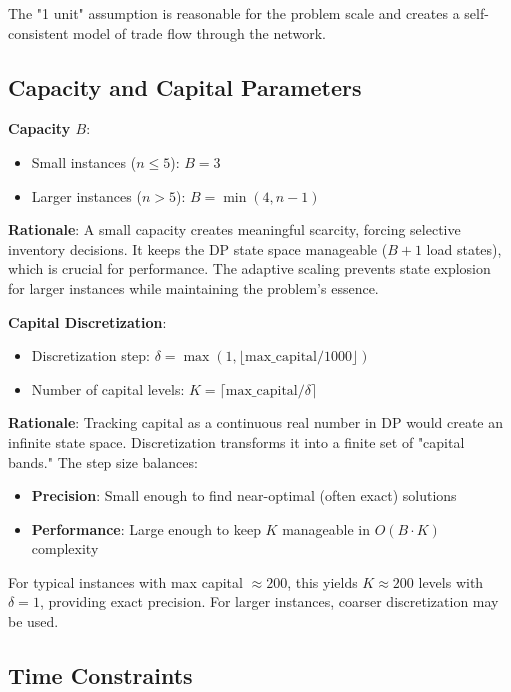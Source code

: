\documentclass[12pt]{article}
\begin{document}
The "1 unit" assumption is reasonable for the problem scale and creates a self-consistent model of trade flow through the network.

\subsection{Capacity and Capital Parameters}
\label{subsec:parameters}

\textbf{Capacity $B$}:
\begin{itemize}
    \item Small instances ($n \leq 5$): $B = 3$
    \item Larger instances ($n > 5$): $B = \min(4, n-1)$
\end{itemize}

\textbf{Rationale}: A small capacity creates meaningful scarcity, forcing selective inventory decisions. It keeps the DP state space manageable ($B+1$ load states), which is crucial for performance. The adaptive scaling prevents state explosion for larger instances while maintaining the problem's essence.

\textbf{Capital Discretization}:
\begin{itemize}
    \item Discretization step: $\delta = \max(1, \lfloor \text{max\_capital} / 1000 \rfloor)$
    \item Number of capital levels: $K = \lceil \text{max\_capital} / \delta \rceil$
\end{itemize}

\textbf{Rationale}: Tracking capital as a continuous real number in DP would create an infinite state space. Discretization \cite{cormen2009} transforms it into a finite set of "capital bands." The step size balances:
\begin{itemize}
    \item \textbf{Precision}: Small enough to find near-optimal (often exact) solutions
    \item \textbf{Performance}: Large enough to keep $K$ manageable in $O(B \cdot K)$ complexity
\end{itemize}

For typical instances with max capital $\approx 200$, this yields $K \approx 200$ levels with $\delta = 1$, providing exact precision. For larger instances, coarser discretization may be used.

\subsection{Time Constraints}
\label{subsec:time_constraints}
\end{document}
